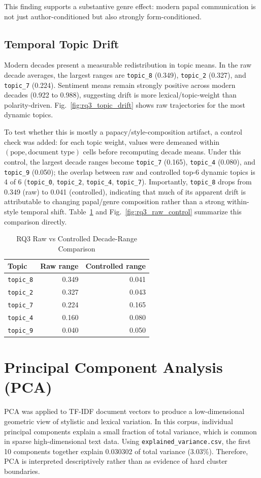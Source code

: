 \documentclass[conference]{IEEEtran}
\begin{document}
This finding supports a substantive genre effect: modern papal communication is not just author-conditioned but also strongly form-conditioned.

\subsection{Temporal Topic Drift}
Modern decades present a measurable redistribution in topic means. In the raw decade averages, the largest ranges are \texttt{topic\_8} (0.349), \texttt{topic\_2} (0.327), and \texttt{topic\_7} (0.224). Sentiment means remain strongly positive across modern decades (0.922 to 0.988), suggesting drift is more lexical/topic-weight than polarity-driven. Fig.~\ref{fig:rq3_topic_drift} shows raw trajectories for the most dynamic topics.

To test whether this is mostly a papacy/style-composition artifact, a control check was added: for each topic weight, values were demeaned within \((\text{pope},\text{document type})\) cells before recomputing decade means. Under this control, the largest decade ranges become \texttt{topic\_7} (0.165), \texttt{topic\_4} (0.080), and \texttt{topic\_9} (0.050); the overlap between raw and controlled top-6 dynamic topics is 4 of 6 (\texttt{topic\_0}, \texttt{topic\_2}, \texttt{topic\_4}, \texttt{topic\_7}). Importantly, \texttt{topic\_8} drops from 0.349 (raw) to 0.041 (controlled), indicating that much of its apparent drift is attributable to changing papal/genre composition rather than a strong within-style temporal shift. Table~\ref{tab:rq3_raw_control} and Fig.~\ref{fig:rq3_raw_control} summarize this comparison directly.

\begin{table}[htbp]
\caption{RQ3 Raw vs Controlled Decade-Range Comparison}
\label{tab:rq3_raw_control}
\centering
\begin{tabular}{lrr}
\toprule
Topic & Raw range & Controlled range \\
\midrule
\texttt{topic\_8} & 0.349 & 0.041 \\
\texttt{topic\_2} & 0.327 & 0.043 \\
\texttt{topic\_7} & 0.224 & 0.165 \\
\texttt{topic\_4} & 0.160 & 0.080 \\
\texttt{topic\_9} & 0.040 & 0.050 \\
\bottomrule
\end{tabular}
\end{table}

\section{Principal Component Analysis (PCA)}
PCA was applied to TF-IDF document vectors to produce a low-dimensional geometric view of stylistic and lexical variation. In this corpus, individual principal components explain a small fraction of total variance, which is common in sparse high-dimensional text data. Using \texttt{explained\_variance.csv}, the first 10 components together explain 0.030302 of total variance (3.03\%). Therefore, PCA is interpreted descriptively rather than as evidence of hard cluster boundaries.
\end{document}
